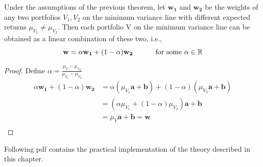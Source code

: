 \begin{theorem} 
    Under the assumptions of the previous theorem, let $\mathbf{w_{1}}$ and $\mathbf{w_{2}}$ be the weights of any two portfolios $V_{1},V_{2}$ on the minimum variance line with different expected returns $\mu_{V_{1}}\neq\mu_{V_{2}}$. Then each portfolio V on the minimum variance line can be obtained as a linear combination of these two, i.e., $$\mathbf{w}=\alpha\mathbf{w_{1}}+(1-\alpha)\mathbf{w_{2}} \hspace{10mm} \text{ for some } \alpha \in \mathbb{R}$$
\end{theorem}
\begin{proof}
Define $\alpha = \frac{\mu_{V}-\mu_{V_{2}}}{\mu_{V_{1}}-\mu_{V_{2}}}$
\begin{align*}
        \alpha\mathbf{w_{1}}+(1-\alpha)\mathbf{w_{2}} &= \alpha (\mu_{V_{1}}\mathbf{a+b}) + (1-\alpha)(\mu_{V_{2}}\mathbf{a+b}) \\
        &= (\alpha \mu_{V_{1}} + (1-\alpha)\mu_{V_{2}})\mathbf{a+b} \\
        &= \mu_{V}\mathbf{a+b} = \mathbf{w} \\
\end{align*}
\end{proof}
Following pdf contains the practical implementation of the theory described in this chapter.
